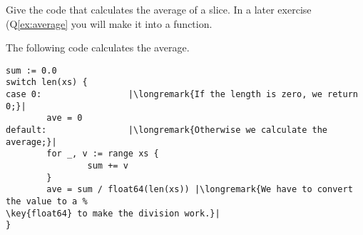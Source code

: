 \begin{Exercise}[title={Average},difficulty=4]
\label{ex:average no func}
\Question\label{ex:average no func q1} Give the code
that calculates the average of a  slice. In
a later exercise (Q\ref{ex:average} you will make it into
a function.
\end{Exercise}

\begin{Answer}
\Question The following code calculates the average.
\begin{lstlisting}
sum := 0.0 
switch len(xs) {
case 0:                 |\longremark{If the length is zero, we return 0;}|
        ave = 0
default:                |\longremark{Otherwise we calculate the average;}|
        for _, v := range xs {
                sum += v
        }
        ave = sum / float64(len(xs)) |\longremark{We have to convert the value to a %
\key{float64} to make the division work.}|
}
\end{lstlisting}
\showremarks
\end{Answer}
